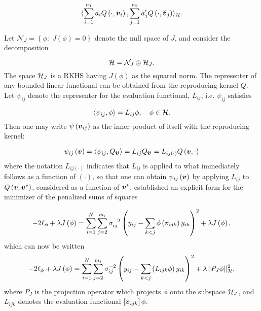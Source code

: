 \begin{equation}
 \langle\sum_{i = 1}^{n_1} a_i Q\left(\cdot, \mbox{\boldmath $v$}_i\right), \sum_{j = 1}^{n_2} a'_j Q\left(\cdot, \breve{\mbox{\boldmath $v$}}_j\right) \rangle_{\mathcal{H}}.
\end{equation}

\bigskip


Let $\mathcal{N}_J = \left\{ \phi:\; J\left(\phi\right) = 0\right\}$ denote the null space of $J$, and consider the decomposition

\[
\mathcal{H} = \mathcal{N}_J \oplus \mathcal{H}_J.
\]
\noindent
The space $\mathcal{H}_J$ is a RKHS having $J\left(\phi\right)$ as the squared norm. The representer of any bounded linear functional can be obtained from the reproducing kernel $Q$. Let $\psi_{ij}$ denote the representer for the evaluation functional, $L_{ij}$, i.e. $\psi_{ij}$ satisfies

\[
\langle \psi_{ij}, \phi \rangle = L_{ij} \phi, \quad \phi \in \mathcal{H}.
\]
\noindent
Then one may write $\psi\left( \mbox{\boldmath $v$}_{ij} \right)$ as the inner product of itself with the reproducing kernel:

\begin{equation} \label{eq:representer-as-inner-product}
\psi_{ij}\left( \mbox{\boldmath $v$} \right) = \langle \psi_{ij}, Q_{\mbox{\boldmath $v$}} \rangle = L_{ij} Q_{\mbox{\boldmath $v$}} = L_{ij\left(\cdot\right)} Q \left(\mbox{\boldmath $v$},\cdot\right)
\end{equation}
 \noindent
 where the notation $L_{ij\left(\cdot\right)}$ indicates that $L_{ij}$ is applied to what immediately follows as a function of $\left( \cdot \right)$, so that one can obtain $\psi_{ij}\left(\mbox{\boldmath $v$}\right)$ by applying $L_{ij}$ to $Q\left(\mbox{\boldmath $v$}, \mbox{\boldmath $v$}^*\right)$, considered as a function of $\mbox{\boldmath $v$}^*$. \cite{wahba1990spline} established an explicit form for the minimizer of the penalized sums of squares
 
 \begin{equation} \label{eq:phi-penalized-sums-of-squares}
 -2\ell_\phi + \lambda J\left(\phi\right) = \sum_{i=1}^N \sum_{j=2}^{m_i} \sigma^{-2}_{ij}\left( y_{ij} - \sum_{k<j} \phi\left(\mbox{\boldmath $v$}_{ijk}\right) y_{ik}  \right)^2 + \lambda J\left( \phi \right),
 \end{equation}
 \noindent
 which can now be written
 \begin{equation} \label{eq:phi-penalized-sums-of-squares-RK-norm}
-2\ell_\phi + \lambda J\left(\phi\right) = \sum_{i=1}^N \sum_{j=2}^{m_i} \sigma^{-2}_{ij}\left( y_{ij} - \sum_{k<j}\left( L_{ijk}\phi\right) y_{ik}  \right)^2 + \lambda \vert\vert P_J \phi \vert \vert_{\mathcal{H}}^2, 
\end{equation} 
\noindent
where $P_J$ is the projection operator which projects $\phi$ onto the subspace $\mathcal{H}_J$, and $L_{ijk}$ denotes the evaluation functional $\left[\mbox{\boldmath $v$}_{ijk}\right] \phi$. 
 
